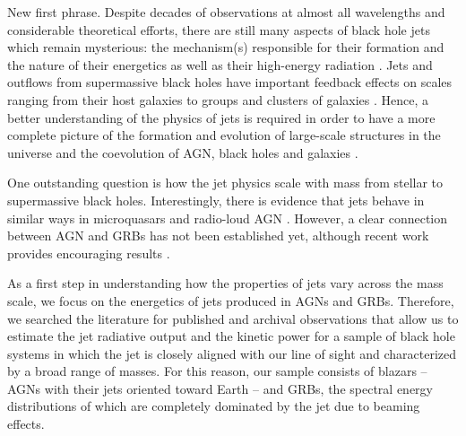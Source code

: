 \documentclass[12pt]{article}
\begin{document}












New first phrase.
Despite decades of observations at almost all wavelengths and considerable theoretical efforts, there are still many aspects of black hole jets which remain mysterious: the mechanism(s) responsible for their formation and the nature of their energetics as well as their high-energy radiation \cite{meier01, nar05}. 
Jets and outflows from supermassive black holes have important feedback effects on scales ranging from their host galaxies to groups and clusters of galaxies \cite{mcnamara07}. Hence, a better understanding of the physics of jets is required in order to have a more complete picture of the formation and evolution of large-scale structures in the universe and the coevolution of AGN, black holes and galaxies \cite{sijacki07}.

One outstanding question is how the jet physics scale with mass from stellar to supermassive black holes. Interestingly, there is evidence that jets behave in similar ways in microquasars and radio-loud AGN \cite{marscher02,merloni03,falcke04}. However, a clear connection between AGN and GRBs has not been established yet, although recent work provides encouraging results \cite{wang11,wu11}.

As a first step in understanding how the properties of jets vary across the mass scale, we focus on the energetics of jets produced in AGNs and GRBs. 
Therefore, we searched the literature for published and archival observations that allow us to estimate the jet radiative output and the kinetic power for a sample of black hole systems in which the jet is closely aligned with our line of sight and characterized by a broad range of masses. For this reason, our sample consists of blazars -- AGNs with their jets oriented toward Earth \cite{ulrich97} -- and GRBs, the spectral energy distributions of which are completely dominated by the jet due to beaming effects.
\end{document}
